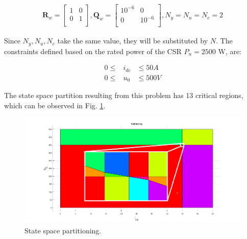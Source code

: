     \begin{equation}
        \begin{array}{l}
            \textbf{R}_w=\begin{bmatrix}
                1& 0\\
                0& 1\\
            \end{bmatrix},
            \textbf{Q}_w=\begin{bmatrix}
                10^{-6}& 0\\
                0& 10^{-6}\\
            \end{bmatrix},
            N_y=N_u=N_c=2
        \end{array}
        \label{EMPC:equ:quadratic_mtx_set}
    \end{equation}

    Since $N_y,N_u,N_c$ take the same value, they will be substituted by $N$.
    The constraints defined based on the rated power of the CSR $P_n=2500$ W, are:

    \begin{equation}
        \begin{array}{rcl}
            0\leq&i_{dc}&\leq 50A\\
            0\leq&u_{0}&\leq 500V
        \end{array}
        \label{EMPC:equ:numeric_constraints}
    \end{equation}

    The state space partition resulting from this problem has 13 critical regions, which can be observed in Fig. \ref{EMPC:fig:regions}.

    \begin{figure}[!ht]
        \centering
        \includegraphics[width=\textwidth]{EMPC_PNG_Pics/Regions.png}
        \caption{State space partitioning.}
        \label{EMPC:fig:regions}
    \end{figure}

